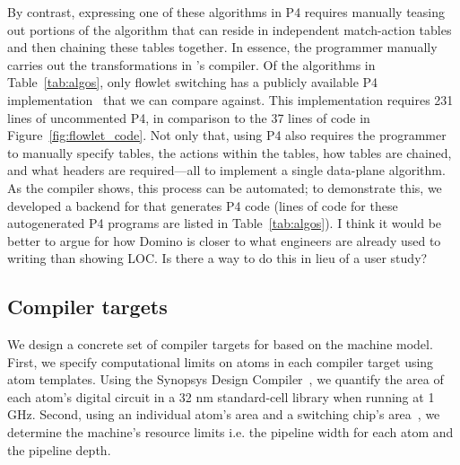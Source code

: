By contrast, expressing one of these algorithms in P4 requires manually teasing
out portions of the algorithm that can reside in independent match-action
tables and then chaining these tables together. In essence, the programmer
manually carries out the transformations in \pktlanguage's compiler. Of the
algorithms in Table~\ref{tab:algos}, only flowlet switching has a publicly
available P4 implementation~\cite{p4_flowlet} that we can compare against. This
implementation requires 231 lines of uncommented P4, in comparison to the 37
lines of \pktlanguage code in Figure~\ref{fig:flowlet_code}. Not only that, using
P4 also requires the
programmer to manually specify tables, the actions within the tables, how
tables are chained, and what headers are required---all to implement a single
data-plane algorithm. As the \pktlanguage compiler shows, this process can be
automated; to demonstrate this, we developed a backend for \pktlanguage that
generates P4 code (lines of code for these autogenerated P4 programs are listed
in Table~\ref{tab:algos}).
\ac{I think it would be better to argue for how Domino is closer to what 
engineers are already used to writing than showing LOC. Is there a way to do 
this in lieu of a user study?}

\subsection{Compiler targets}
\label{ss:targets}

We design a concrete set of compiler targets for \pktlanguage based on the
\absmachine machine model. First, we specify computational limits on atoms in
each compiler target using atom templates. Using the Synopsys Design
Compiler~\cite{synopsys_dc}, we quantify the area of each atom's digital
circuit in a 32 nm standard-cell library when running at 1 GHz.  Second, using
an individual atom's area and a switching chip's area~\cite{gibb_parsing}, we
determine the machine's resource limits i.e. the pipeline width for each atom
and the pipeline depth.

